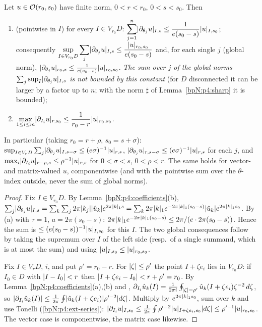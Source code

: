 \begin{lemma}[B.3]\label{bpN:p4:cauchy}
Let $u\in\mathcal O(r_0,s_0)$ have finite norm, $0<r<r_0$, $0<s<s_0$. Then
\begin{enumerate}[label=(\alph*)]
\item (pointwise in $I$) for every $I\in V_{r_0}D$: $\displaystyle\sum_{j=1}^n\lvert \partial_{\theta_j}u\rvert_{I,s}\le\frac1{e(s_0-s)}\lvert u\rvert_{I,s_0}$; consequently $\displaystyle\sup_{I\in V_{r_0}D}\sum_{j}\lvert \partial_{\theta_j}u\rvert_{I,s}\le\frac{\lvert u\rvert_{r_0,s_0}}{e(s_0-s)}$ and, for each single $j$ (global norm), $\lvert \partial_{\theta_j}u\rvert_{r_0,s}\le\frac1{e(s_0-s)}\lvert u\rvert_{r_0,s_0}$. \emph{The sum over $j$ of the global norms $\sum_j\sup_I\lvert \partial_{\theta_j}u\rvert_{I,s}$ is not bounded by this constant} (for $D$ disconnected it can be larger by a factor up to $n$; with the norm $\sharp$ of Lemma~\ref{bpN:p4:sharp} it is bounded);
\item $\displaystyle\max_{1\le i\le m}\lvert \partial_{I_i}u\rvert_{r,s_0}\le\frac1{r_0-r}\lvert u\rvert_{r_0,s_0}$.
\end{enumerate}
In particular (taking $r_0=r+\rho$, $s_0=s+\sigma$): $\sup_{I\in V_rD}\sum_j\lvert \partial_{\theta_j}u\rvert_{I,s-\sigma}\le(e\sigma)^{-1}\lvert u\rvert_{r,s}$, $\lvert \partial_{\theta_j}u\rvert_{r,s-\sigma}\le(e\sigma)^{-1}\lvert u\rvert_{r,s}$ for each $j$, and $\max_i\lvert \partial_{I_i}u\rvert_{r-\rho,s}\le\rho^{-1}\lvert u\rvert_{r,s}$ for $0<\sigma<s$, $0<\rho<r$. The same holds for vector- and matrix-valued $u$, componentwise (and with the pointwise sum over the $\theta$-index outside, never the sum of global norms).
\end{lemma}
\begin{proof}
\label{stepN:p4:b3-a} Fix $I\in V_{r_0}D$. By Lemma~\ref{bpN:p4:coefficients}(b), $\sum_j\lvert \partial_{\theta_j}u\rvert_{I,s}=\sum_k\sum_j2\pi\lvert k_j\rvert\lvert \hat u_k\rvert e^{2\pi\lvert k\rvert_1s}=\sum_k2\pi\lvert k\rvert_1e^{-2\pi\lvert k\rvert_1(s_0-s)}\lvert \hat u_k\rvert e^{2\pi\lvert k\rvert_1s_0}$.
By (a) with $\tau=1$, $a=2\pi(s_0-s)$: $2\pi\lvert k\rvert_1e^{-2\pi\lvert k\rvert_1(s_0-s)}\le2\pi/(e\cdot2\pi(s_0-s))$. Hence the sum is $\le(e(s_0-s))^{-1}\lvert u\rvert_{I,s_0}$ for this $I$. The two global consequences follow by taking the supremum over $I$ of the left side (resp.\ of a single summand, which is at most the sum) and using $\lvert u\rvert_{I,s_0}\le\lvert u\rvert_{r_0,s_0}$.

\label{stepN:p4:b3-b} Fix $I\in V_rD$, $i$, and put $\rho'=r_0-r$. For $\lvert \zeta\rvert\le\rho'$ the point $I+\zeta e_i$ lies in $V_{r_0}D$: if $I_0\in D$ with $\lvert I-I_0\rvert<r$ then $\lvert I+\zeta e_i-I_0\rvert<r+\rho'=r_0$.
By Lemma~\ref{bpN:p4:coefficients}(a),(b) and , $\partial_{I_i}\hat u_k(I)=\frac1{2\pi i}\oint_{\lvert \zeta\rvert=\rho'}\hat u_k(I+\zeta e_i)\zeta^{-2}\,d\zeta$, so
$\lvert \partial_{I_i}\hat u_k(I)\rvert\le\frac1{2\pi}\oint\lvert \hat u_k(I+\zeta e_i)\rvert\rho'^{-2}\lvert d\zeta\rvert$. Multiply by $e^{2\pi\lvert k\rvert_1s_0}$, sum over $k$ and use Tonelli (\ref{bpN:p4:ext-series}):
$\lvert \partial_{I_i}u\rvert_{I,s_0}\le\frac1{2\pi}\oint\rho'^{-2}\lvert u\rvert_{I+\zeta e_i,s_0}\lvert d\zeta\rvert\le\rho'^{-1}\lvert u\rvert_{r_0,s_0}$.
The vector case is componentwise, the matrix case likewise.
\end{proof}

